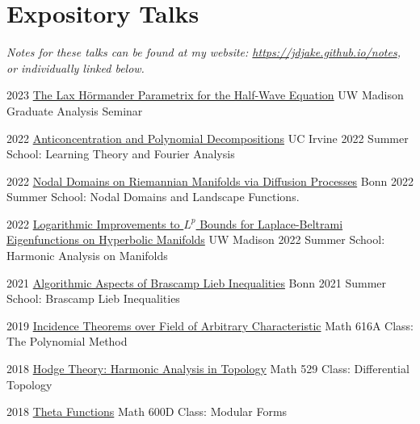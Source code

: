 \documentclass[a4paper]{cv-friggeri}
\begin{document}
\section{Expository Talks}

\emph{Notes for these talks can be found at my website: \href{https://jdjake.github.io/notes}{https://jdjake.github.io/notes}, or individually linked below.}

\begin{entrylist}

\entry
{2023}
{\href{https://github.com/jdjake/Notes/raw/master/Talks/TalkNotes/LaxParametrix.pdf}{The Lax H\"{o}rmander Parametrix for the Half-Wave Equation}}
{}
{UW Madison Graduate Analysis Seminar}

\entry
{2022}
{\href{https://github.com/jdjake/Notes/raw/master/Talks/TalkNotes/AnticoncentrationPolynomialDecompositions.pdf}{Anticoncentration and Polynomial Decompositions}}
{}
{UC Irvine 2022 Summer School: Learning Theory and Fourier Analysis}

\entry
{2022}
{\href{https://github.com/jdjake/Notes/raw/master/Talks/TalkNotes/NodalGeometryAndBrownianMotion.pdf}{Nodal Domains on Riemannian Manifolds via Diffusion Processes}}
{}
{Bonn 2022 Summer School: Nodal Domains and Landscape Functions.}

\entry
{2022}
{\href{https://github.com/jdjake/Notes/raw/master/Talks/TalkNotes/LogarithmicImprovementsSpectralBands.pdf}{Logarithmic Improvements to $L^p$ Bounds for Laplace-Beltrami Eigenfunctions on Hyperbolic Manifolds}}
{}
{UW Madison 2022 Summer School: Harmonic Analysis on Manifolds}

\entry
{2021}
{\href{https://github.com/jdjake/Notes/raw/master/Talks/TalkNotes/RankDecreasingAndCapacity.pdf}{Algorithmic Aspects of Brascamp Lieb Inequalities}}
{}
{Bonn 2021 Summer School: Brascamp Lieb Inequalities}

\entry
{2019}
{\href{https://github.com/jdjake/Notes/raw/master/Talks/TalkNotes/SzemerediTrotterin3D.pdf}{Incidence Theorems over Field of Arbitrary Characteristic}}
{}
{Math 616A Class: The Polynomial Method}

\entry
{2018}
{\href{https://github.com/jdjake/Notes/raw/master/Talks/TalkNotes/HodgeTheory.pdf}{Hodge Theory: Harmonic Analysis in Topology}}
{}
{Math 529 Class: Differential Topology}

\entry
{2018}
{\href{https://github.com/jdjake/Notes/raw/master/Talks/TalkNotes/ThetaFunctions.pdf}{Theta Functions}}
{}
{Math 600D Class: Modular Forms}


\end{entrylist}
\end{document}
